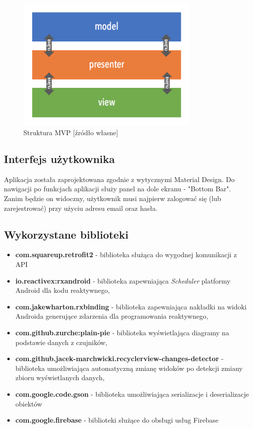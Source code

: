 \begin{figure}[H]
    \centering
    \includegraphics[width=9cm]{android-mvp.png}
    \caption{Struktura MVP [źródło własne]}
\end{figure}

\subsection{Interfejs użytkownika}
Aplikacja została zaprojektowana zgodnie z wytycznymi Material Design. \cite{MDESIGN}
Do nawigacji po funkcjach aplikacji służy panel na dole ekranu - "Bottom Bar".
Zanim będzie on widoczny, użytkownik musi najpierw zalogować się (lub zarejestrować) przy użyciu adresu email oraz hasła.

\subsection{Wykorzystane biblioteki}
\begin{itemize}
    \item \textbf{com.squareup.retrofit2} - biblioteka służąca do wygodnej komunikacji z API
    \item \textbf{io.reactivex:rxandroid} - biblioteka zapewniająca \textit{Scheduler} platformy Android dla kodu reaktywnego,
    \item \textbf{com.jakewharton.rxbinding} - biblioteka zapewniająca nakładki na widoki Androida generujące zdarzenia dla programowania reaktywnego,
    \item \textbf{com.github.zurche:plain-pie} - biblioteka wyświetlająca diagramy na podstawie danych z czujników,
    \item \textbf{com.github.jacek-marchwicki.recyclerview-changes-detector} - biblioteka umożliwiająca automatyczną zmianę widoków po detekcji zmiany zbioru wyświetlanych danych,
    \item \textbf{com.google.code.gson} - biblioteka umożliwiająca serializacje i deserializacje obiektów
    \item \textbf{com.google.firebase} - biblioteki służące do obsługi usług Firebase
\end{itemize}

